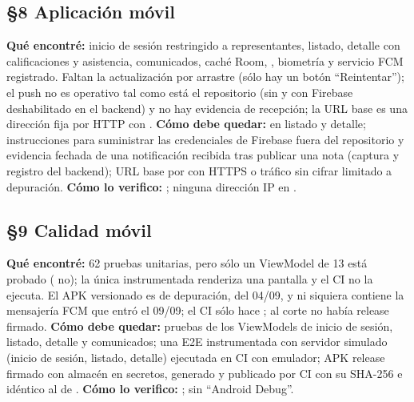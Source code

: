 \subsection*{\S8 Aplicaci\'on m\'ovil}
\textbf{Qu\'e encontr\'e:} inicio de sesi\'on restringido a representantes, listado, detalle con calificaciones y asistencia, comunicados, cach\'e Room, , biometr\'ia y servicio FCM registrado. Faltan la actualizaci\'on por arrastre (s\'olo hay un bot\'on ``Reintentar''); el push no es operativo tal como est\'a el repositorio (sin  y con Firebase deshabilitado en el backend) y no hay evidencia de recepci\'on; la URL base es una direcci\'on fija por HTTP con . \textbf{C\'omo debe quedar:}  en listado y detalle; instrucciones para suministrar las credenciales de Firebase fuera del repositorio y evidencia fechada de una notificaci\'on recibida tras publicar una nota (captura y registro del backend); URL base por  con HTTPS o tr\'afico sin cifrar limitado a depuraci\'on. \textbf{C\'omo lo verifico:} ; ninguna direcci\'on IP en .

\subsection*{\S9 Calidad m\'ovil}
\textbf{Qu\'e encontr\'e:} 62 pruebas unitarias, pero s\'olo un ViewModel de 13 est\'a probado ( no); la \'unica instrumentada renderiza una pantalla y el CI no la ejecuta. El APK versionado es de depuraci\'on, del 04/09, y ni siquiera contiene la mensajer\'ia FCM que entr\'o el 09/09; el CI s\'olo hace ; al corte no hab\'ia release firmado. \textbf{C\'omo debe quedar:} pruebas de los ViewModels de inicio de sesi\'on, listado, detalle y comunicados; una E2E instrumentada con servidor simulado (inicio de sesi\'on, listado, detalle) ejecutada en CI con emulador; APK release firmado con almac\'en en secretos, generado y publicado por CI con su SHA-256 e id\'entico al de . \textbf{C\'omo lo verifico:} ;  sin ``Android Debug''.

